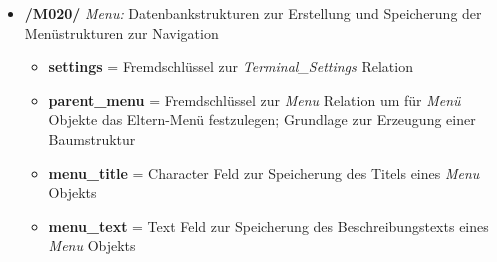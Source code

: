 \begin{itemize}
    \item \textbf{/M020/} \textit{Menu:} Datenbankstrukturen zur Erstellung und Speicherung der Menüstrukturen zur Navigation
    \begin{itemize}
        \item \textbf{settings} = Fremdschlüssel zur \textit{Terminal\_Settings} Relation
        \item \textbf{parent\_menu} = Fremdschlüssel zur \textit{Menu} Relation um für \textit{Menü} Objekte das Eltern-Menü festzulegen; Grundlage zur Erzeugung einer Baumstruktur
        \item \textbf{menu\_title} = Character Feld zur Speicherung des Titels eines \textit{Menu} Objekts
        \item \textbf{menu\_text} = Text Feld zur Speicherung des Beschreibungstexts eines \textit{Menu} Objekts
    \end{itemize}
\end{itemize}
\vspace{0,5cm}

